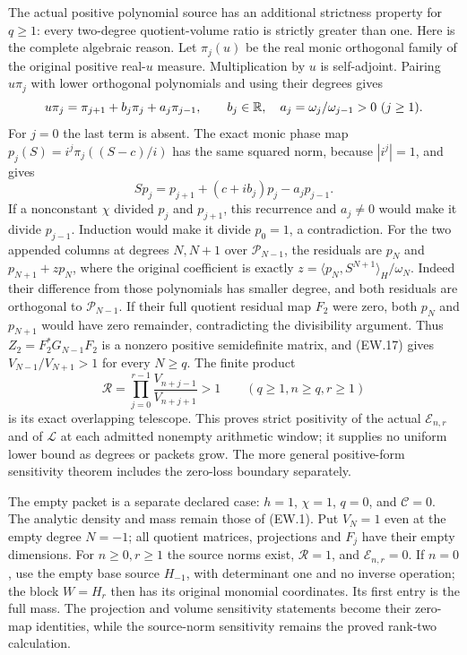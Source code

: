 The actual positive polynomial source has an additional strictness
property for $q\ge1$: every two-degree quotient-volume ratio is
strictly greater than one. Here is the complete algebraic reason.
Let $\pi_j(u)$ be the real monic orthogonal family of the original
positive real-$u$ measure. Multiplication by $u$ is self-adjoint.
Pairing $u\pi_j$ with lower orthogonal polynomials and using their
degrees gives
\[
 u\pi_j=\pi_{j+1}+b_j\pi_j+a_j\pi_{j-1},\qquad
 b_j\in\mathbb R,\quad a_j=\omega_j/\omega_{j-1}>0\ (j\ge1).
\]
For $j=0$ the last term is absent. The exact monic phase map
$p_j(S)=i^j\pi_j((S-c)/i)$ has the same squared norm, because
$|i^j|=1$, and gives
\[
 S p_j=p_{j+1}+(c+ib_j)p_j-a_jp_{j-1}. 
\]
If a nonconstant $\chi$ divided $p_j$ and $p_{j+1}$, this
recurrence and $a_j\ne0$ would make it divide $p_{j-1}$.
Induction would make it divide $p_0=1$, a contradiction.
For the two appended columns at degrees $N,N+1$ over
$\mathcal P_{N-1}$, the residuals are $p_N$ and
$p_{N+1}+z p_N$, where the original coefficient is exactly
$z=\langle p_N,S^{N+1}\rangle_H/\omega_N$.
Indeed their difference from those polynomials has smaller degree,
and both residuals are orthogonal to $\mathcal P_{N-1}$.
If their full quotient residual map $F_2$ were zero, both $p_N$
and $p_{N+1}$ would have zero remainder, contradicting the
divisibility argument. Thus $Z_2=F_2^*G_{N-1}F_2$ is a
nonzero positive semidefinite matrix, and (EW.17) gives
$V_{N-1}/V_{N+1}>1$ for every $N\ge q$.
The finite product
\[
 \mathscr R=\prod_{j=0}^{r-1}
                  \frac{V_{n+j-1}}{V_{n+j+1}}>1
 \qquad(q\ge1,n\ge q,r\ge1)                                \tag{EW.46a}
\]
is its exact overlapping telescope. This proves strict positivity
of the actual $\mathcal E_{n,r}$ and of $\mathscr L$ at each
admitted nonempty arithmetic window; it supplies no uniform lower
bound as degrees or packets grow. The more general positive-form
sensitivity theorem includes the zero-loss boundary separately.

The empty packet is a separate declared case: $h=1$, $\chi=1$,
$q=0$, and $\mathcal C=0$. The analytic density and mass remain
those of (EW.1). Put $V_N=1$ even at the empty degree $N=-1$;
all quotient matrices, projections and $F_j$ have their empty
dimensions. For $n\ge0,r\ge1$ the source norms exist,
$\mathscr R=1$, and $\mathcal E_{n,r}=0$. If $n=0$, use the
empty base source $H_{-1}$, with determinant one and no inverse
operation; the block $W=H_r$ then has its original monomial
coordinates. Its first entry is the full mass. The projection and
volume sensitivity statements become their zero-map identities,
while the source-norm sensitivity remains the proved rank-two
calculation.

